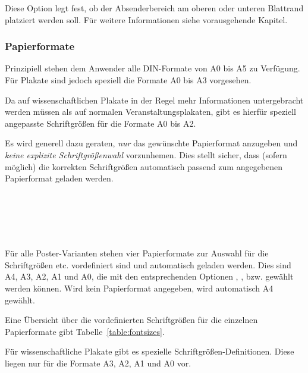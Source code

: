 \begin{Declaration}
\end{Declaration}

Diese Option legt fest, ob der Absenderbereich am oberen oder unteren Blattrand
platziert werden soll. Für weitere Informationen siehe vorausgehende Kapitel.


\subsubsection{Papierformate}%

Prinzipiell stehen dem Anwender alle DIN-Formate von A0 bis A5 zu Verfügung.
Für Plakate sind jedoch speziell die Formate A0 bis A3 vorgesehen.

Da auf wissenschaftlichen Plakate in der Regel mehr Informationen untergebracht
werden müssen als auf normalen Veranstaltungsplakaten, gibt es hierfür
speziell angepasste Schriftgrößen für die Formate A0 bis A2.

\begin{important}
Es wird generell dazu geraten, \emph{nur} das gewünschte Papierformat
anzugeben und \emph{keine explizite Schriftgrößenwahl} vorzunhemen.
Dies stellt sicher, dass (sofern möglich) die korrekten Schriftgrößen
automatisch passend zum angegebenen Papierformat geladen werden.
\end{important}



\begin{Declaration}
  \\
  \\
  \\
  \\
\end{Declaration}

Für alle Poster-Varianten stehen vier Papierformate zur Auswahl für die
Schriftgrößen etc. vordefiniert sind und automatisch geladen werden.
Dies sind A4, A3, A2, A1 und A0, die mit den entsprechenden Optionen
, ,  bzw. 
gewählt werden können.
Wird kein Papierformat angegeben, wird automatisch A4 gewählt.

Eine Übersicht über die vordefinierten Schriftgrößen für die einzelnen
Papierformate gibt Tabelle~\ref{table:fontsizes}.

\begin{important}
  Für wissenschaftliche Plakate gibt es spezielle Schriftgrößen-Definitionen.
  Diese liegen nur für die Formate A3, A2, A1 und A0 vor.
\end{important}

